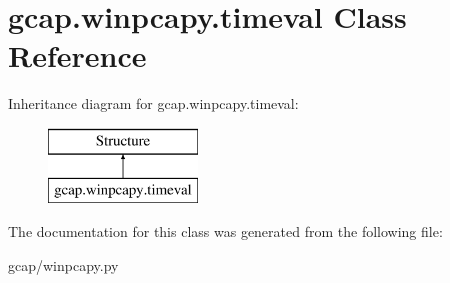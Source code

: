 \hypertarget{classgcap_1_1winpcapy_1_1timeval}{}\section{gcap.\+winpcapy.\+timeval Class Reference}
\label{classgcap_1_1winpcapy_1_1timeval}
Inheritance diagram for gcap.\+winpcapy.\+timeval\+:\begin{figure}[H]
\begin{center}
\leavevmode
\includegraphics[height=2.000000cm]{d6/d0d/classgcap_1_1winpcapy_1_1timeval}
\end{center}
\end{figure}


The documentation for this class was generated from the following file\+:\begin{DoxyCompactItemize}
\item 
gcap/winpcapy.\+py\end{DoxyCompactItemize}
